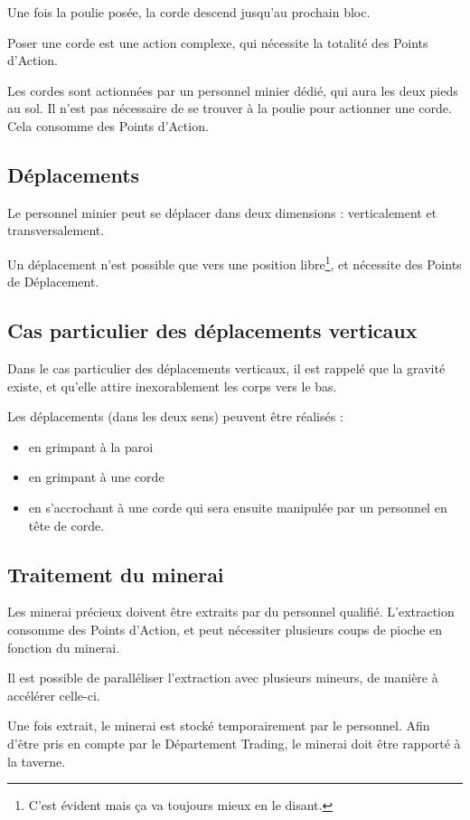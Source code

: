 Une fois la poulie posée, la corde descend jusqu'au prochain bloc.

Poser une corde est une action complexe, qui nécessite la totalité des Points d'Action.

Les cordes sont actionnées par un personnel minier dédié, qui aura les deux pieds au sol. Il n'est pas nécessaire de se trouver à la poulie pour actionner une corde. Cela consomme des Points d'Action.


\subsection{Déplacements}
Le personnel minier peut se déplacer dans deux dimensions : verticalement et transversalement.

Un déplacement n'est possible que vers une position libre\footnote{C'est évident mais ça va toujours mieux en le disant.}, et nécessite des Points de Déplacement.

\subsection{Cas particulier des déplacements verticaux}
Dans le cas particulier des déplacements verticaux, il est rappelé que la gravité existe, et qu'elle attire inexorablement les corps vers le bas.

Les déplacements (dans les deux sens) peuvent être réalisés :
\begin{itemize}
        \item en grimpant à la paroi
        \item en grimpant à une corde
        \item en s'accrochant à une corde qui sera ensuite manipulée par un personnel en tête de corde.
\end{itemize}

\subsection{Traitement du minerai}
Les minerai précieux doivent être extraits par du personnel qualifié. L'extraction consomme des Points d'Action, et peut nécessiter plusieurs coups de pioche en fonction du minerai.

Il est possible de paralléliser l'extraction avec plusieurs mineurs, de manière à accélérer celle-ci.

Une fois extrait, le minerai est stocké temporairement par le personnel. Afin d'être pris en compte par le Département Trading, le minerai doit être rapporté à la taverne.

